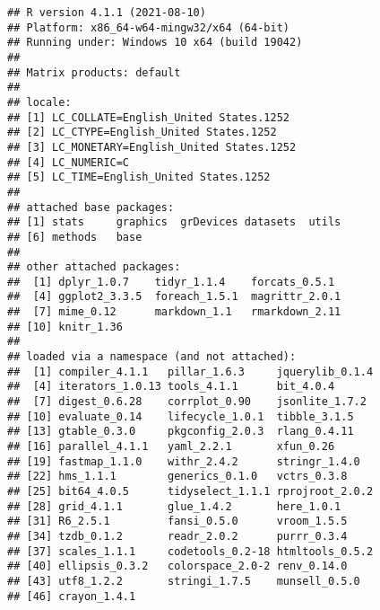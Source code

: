 \documentclass[
  11pt,
  a4paper,
]{scrartcl}
\begin{document}
\begin{verbatim}
## R version 4.1.1 (2021-08-10)
## Platform: x86_64-w64-mingw32/x64 (64-bit)
## Running under: Windows 10 x64 (build 19042)
## 
## Matrix products: default
## 
## locale:
## [1] LC_COLLATE=English_United States.1252 
## [2] LC_CTYPE=English_United States.1252   
## [3] LC_MONETARY=English_United States.1252
## [4] LC_NUMERIC=C                          
## [5] LC_TIME=English_United States.1252    
## 
## attached base packages:
## [1] stats     graphics  grDevices datasets  utils    
## [6] methods   base     
## 
## other attached packages:
##  [1] dplyr_1.0.7    tidyr_1.1.4    forcats_0.5.1 
##  [4] ggplot2_3.3.5  foreach_1.5.1  magrittr_2.0.1
##  [7] mime_0.12      markdown_1.1   rmarkdown_2.11
## [10] knitr_1.36    
## 
## loaded via a namespace (and not attached):
##  [1] compiler_4.1.1   pillar_1.6.3     jquerylib_0.1.4 
##  [4] iterators_1.0.13 tools_4.1.1      bit_4.0.4       
##  [7] digest_0.6.28    corrplot_0.90    jsonlite_1.7.2  
## [10] evaluate_0.14    lifecycle_1.0.1  tibble_3.1.5    
## [13] gtable_0.3.0     pkgconfig_2.0.3  rlang_0.4.11    
## [16] parallel_4.1.1   yaml_2.2.1       xfun_0.26       
## [19] fastmap_1.1.0    withr_2.4.2      stringr_1.4.0   
## [22] hms_1.1.1        generics_0.1.0   vctrs_0.3.8     
## [25] bit64_4.0.5      tidyselect_1.1.1 rprojroot_2.0.2 
## [28] grid_4.1.1       glue_1.4.2       here_1.0.1      
## [31] R6_2.5.1         fansi_0.5.0      vroom_1.5.5     
## [34] tzdb_0.1.2       readr_2.0.2      purrr_0.3.4     
## [37] scales_1.1.1     codetools_0.2-18 htmltools_0.5.2 
## [40] ellipsis_0.3.2   colorspace_2.0-2 renv_0.14.0     
## [43] utf8_1.2.2       stringi_1.7.5    munsell_0.5.0   
## [46] crayon_1.4.1
\end{verbatim}
\end{document}
